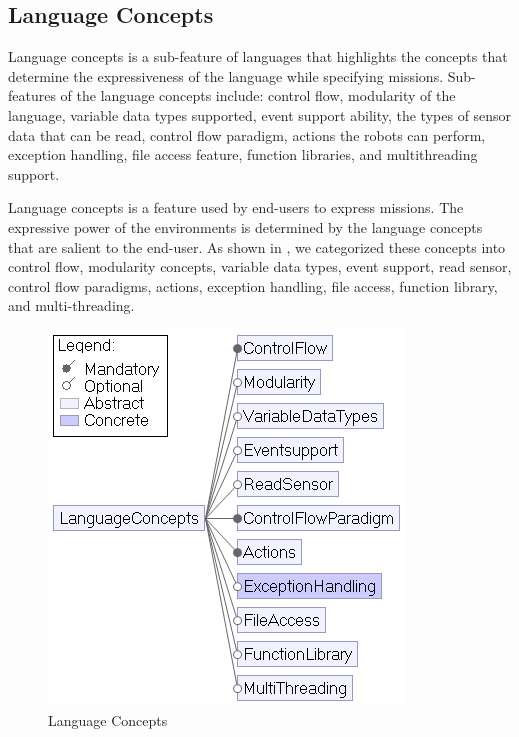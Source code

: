 \subsection{Language Concepts}\label{sec:langconcepts}
Language concepts is a sub-feature of languages that %
highlights the concepts that determine the expressiveness of the language while specifying missions. Sub-features of the language concepts include: control flow, modularity of the language, variable data types supported, event support ability, the types of sensor data that can be read, control flow paradigm, actions the robots can perform, exception handling, file access feature, function libraries, and multithreading support.

Language concepts is a feature %
used by  end-users to express missions. 
The expressive power of the environments is determined by the language concepts that are salient to the end-user. As shown in , we categorized these concepts into control flow, modularity concepts, variable data types, event support, read sensor, control flow paradigms, actions, exception handling, file access, function  library, and multi-threading.  

\begin{figure}[t]
     \centering
    \includegraphics[width=\columnwidth]{LanguageConcepts.png}
      \caption{Language Concepts}
      \label{fig:langconcepts}
   \end{figure}

